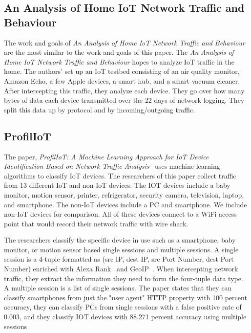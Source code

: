 \subsection{An Analysis of Home IoT Network Traffic and Behaviour}
The work and goals of \textit{An Analysis of Home IoT Network Traffic and Behaviour}~\cite{home_iot} are the most similar to the work and goals of this paper. The \textit{An Analysis of Home IoT Network Traffic and Behaviour} hopes to analyze IoT traffic in the home. The authors' set up an IoT testbed consisting of an air quality monitor, Amazon Echo, a few Apple devices, a smart hub, and a smart vacuum cleaner. After intercepting this traffic, they analyze each device. They go over how many bytes of data each device transmitted over the 22 days of network logging. They split this data up by protocol and by incoming/outgoing traffic.

\subsection{ProfilIoT}
The paper, \textit{ProfilIoT: A Machine Learning Approach for IoT Device Identification Based on Network Traffic Analysis}~\cite{Meidan:2017:PML:3019612.3019878} uses machine learning algorithms to classify IoT devices. The researchers of this paper collect traffic from 13 different IoT and non-IoT devices. The IOT devices include a baby monitor, motion sensor, printer, refrigerator, security camera, television, laptop, and smartphone. The  non-IoT devices include a PC and smartphone. We include non-IoT devices for comparison. All of these devices connect to a WiFi access point that would record their network traffic with wire shark.

The researchers classify the specific device in use such as a smartphone, baby monitor, or motion sensor based single sessions and multiple sessions. A single session is a 4-tuple formatted as (src IP, dest IP, src Port Number, dest Port Number) enriched with Alexa Rank~\cite{alexa} and GeoIP~\cite{maxmind}. When intercepting network traffic, they extract the information they need to form the four-tuple data type. A multiple session is a list of single sessions. The paper states that they can classify smartphones from just the "user agent" HTTP property with 100 percent accuracy, they can classify PCs from single sessions with a false positive rate of 0.003, and they classify IOT devices with 88.271 percent accuracy using multiple sessions

